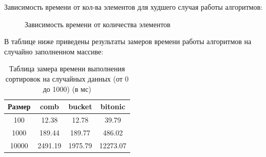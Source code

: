 \documentclass[12pt]{report}
\begin{document}
	Зависимость времени от кол-ва элементов для худшего случая работы алгоритмов:

	\begin{center}
		\begin{figure}[H]
		\center
		\caption{Зависимость времени от количества элементов}
		\end{figure}
	\end{center}
	
	В таблице ниже приведены результаты замеров времени работы алгоритмов на случайно заполненном массиве:
	
	\begin{table} [h!]
		\caption{Таблица замера времени выполнения сортировок на случайных данных (от 0 до 1000) (в мс)}
		\begin{center}
			\begin{tabular}{|c | c | c | c|}
				
				\hline
				
				Размер & comb & bucket & bitonic  \\ [0.5ex]
				
				\hline
				
				100 & 12.38 & 12.78 & 39.79 \\ 
				
				\hline 
				
				1000 & 189.44 & 189.77 & 486.02 \\ 
				
				\hline 
				
				10000 & 2491.19 & 1975.79 & 12273.07 \\ 
				
				\hline 
				
			\end{tabular}
		\end{center}
	\end{table}
\end{document}

